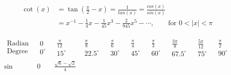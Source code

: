\begin{definition}
    \begin{equation}\label{cot}
    \begin{aligned}
        \cot(x) & = \tan(\frac{\pi}{2} - x) = \frac{1}{tan(x)} = \frac{cos(x)}{sin(x)}\\
		        & = x^{-1} - \frac{1}{3}x - \frac{1}{45}x^3 - \frac{2}{945}x^5 - \cdots, \qquad \text{for } 0 < |x| < \pi
	\end{aligned}
    \end{equation}
    
    \[
        \begin{array}{|c|ccccccccc|}
        \hline
        \begin{matrix}\text{Radian}\\ \text{Degree}\end{matrix} &
        \begin{matrix}0\\ 0^\circ\end{matrix} &
        \begin{matrix}\frac{\pi}{12}\\ 15^\circ\end{matrix} &
        \begin{matrix}\frac{\pi}{8}\\ 22.5^\circ\end{matrix} &
        \begin{matrix}\frac{\pi}{6}\\ 30^\circ\end{matrix} &
        \begin{matrix}\frac{\pi}{4}\\ 45^\circ\end{matrix} &
        \begin{matrix}\frac{\pi}{3}\\ 60^\circ\end{matrix} &
        \begin{matrix}\frac{3\pi}{8}\\ 67.5^\circ\end{matrix} &
        \begin{matrix}\frac{5\pi}{12}\\ 75^\circ\end{matrix} &
        \begin{matrix}\frac{\pi}{2}\\ 90^\circ\end{matrix} \\
        \hline
        \sin &
        0 &
        \frac{ \sqrt{6} - \sqrt{2} } {4} &

\end{array}\]
\end{definition}
